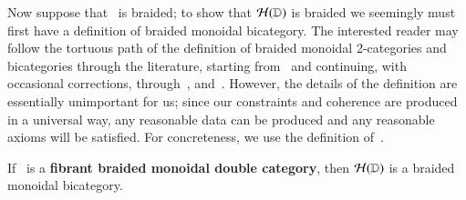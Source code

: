   Now suppose that \lD\ is braided; to show that $\mathcal{H}(\mathbb{D})$ is braided
  we seemingly must first have a definition of braided monoidal
  bicategory.  The interested reader may follow the tortuous path of
  the definition of braided monoidal 2-categories and bicategories
  through the literature, starting from~\cite{kv:2cat-zam,kv:bm2cat}
  and continuing, with occasional corrections,
  through~\cite{bn:hda-i,ds:monbi-hopfagbd,crans:centers,mccrudden:bal-coalgb},
  and~\cite{gurski:brmonbicat}.  However, the details of the
  definition are essentially unimportant for us; since our constraints
  and coherence are produced in a universal way, any reasonable data
  can be produced and any reasonable axioms will be satisfied.  For
  concreteness, we use the definition of~\cite{mccrudden:bal-coalgb}.

\begin{lem}\label{thm:br11-brbi}
  If \lD\ is a {\bf fibrant braided monoidal double category}, then $\mathcal{H}(\mathbb{D})$ is a
 braided monoidal bicategory.  
\end{lem}

